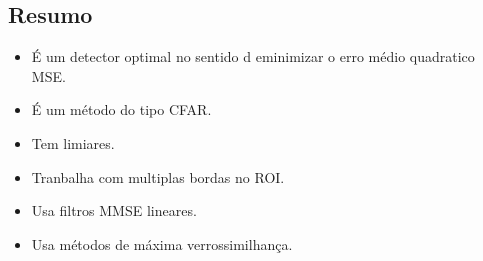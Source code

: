 \documentclass{article}
\begin{document}
\subsection{Resumo}
\begin{itemize}
\item É um detector  optimal no sentido d eminimizar o erro médio quadratico MSE. 
\item É um método do tipo CFAR.
\item Tem limiares.
\item Tranbalha com multiplas bordas no ROI.
\item Usa filtros MMSE lineares.
\item Usa métodos de máxima verrossimilhança.
\end{itemize}

\end{document}
